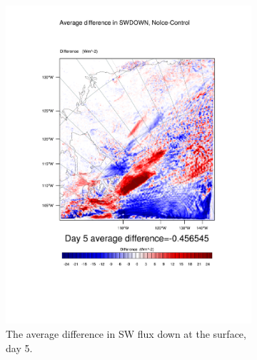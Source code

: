\begin{figure}
\centering
	\begin{subfigure}{0.48\textwidth}
		\includegraphics[width=\textwidth]{results/noice/diff_NoIce_SWDOWN_Day5.pdf}
		\caption{The average difference in SW flux down at the surface, day 5.}
		\label{subfig:swdown_r2Day5}
	\end{subfigure}
	\quad
	\begin{subfigure}{0.48\textwidth}
		\centering

\end{subfigure}
\end{figure}
